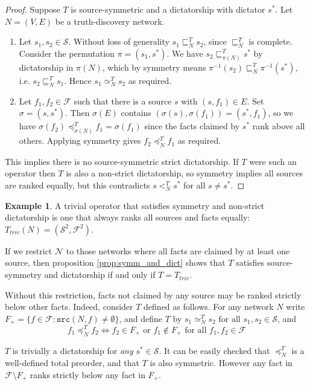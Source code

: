 \documentclass{article}
\theoremstyle{definition} \newtheorem{definition}{Definition}
\theoremstyle{definition} \newtheorem{example}{Example}
\theoremstyle{plain} \newtheorem{axiom}{Axiom}
\theoremstyle{plain} \newtheorem*{remark}{Remark}
\theoremstyle{remark} \newtheorem*{notation}{Notation}
\theoremstyle{plain} \newtheorem{lemma}{Lemma}
\theoremstyle{plain} \newtheorem{proposition}{Proposition}
\renewcommand{\S}{\mathcal{S}}  %
\newcommand{\F}{\mathcal{F}}
\newcommand{\N}{\mathcal{N}}
\newcommand{\sle}{\sqsubseteq}
\newcommand{\slt}{<}
\newcommand{\seq}{\simeq}
\newcommand{\fle}{\preceq}
\newcommand{\src}{\texttt{src}}
\begin{document}
\begin{proof}
Suppose $T$ is source-symmetric and a dictatorship with dictator $s^*$. Let
$N=(V,E)$ be a truth-discovery network.
\begin{enumerate}
\item
    Let $s_1, s_2 \in \S$. Without loss of generality $s_1 \sle_N^T s_2$, since
    $\sle_N^T$ is complete. Consider the permutation $\pi=(s_1, s^*)$.  We have
    $s_2 \sle_{\pi(N)}^T s^*$ by dictatorship in $\pi(N)$, which by symmetry
    means $\pi^{-1}(s_2) \sle_N^T \pi^{-1}(s^*)$, i.e. $s_2 \sle_N^T s_1$.
    Hence $s_1 \seq_N^T s_2$ as required.

\item
    Let $f_1, f_2 \in \F$ such that there is a source $s$ with $(s, f_1) \in E$.
    Set $\sigma=(s, s^*)$. Then $\sigma(E)$ contains $(\sigma(s), \sigma(f_1))
    = (s^*, f_1)$, so we have $\sigma(f_2) \fle_{\sigma(N)}^T f_1 =
    \sigma(f_1)$ since the facts claimed by $s^*$ rank above all others.
    Applying symmetry gives $f_2 \fle_N^T f_1$ as required.
\end{enumerate}

This implies there is no source-symmetric strict dictatorship. If $T$ were such
an operator then $T$ is also a non-strict dictatorship, so symmetry implies
all sources are ranked equally, but this contradicts $s \slt_N^T s^*$ for all
$s \ne s^*$.

\end{proof}

\begin{example}
A trivial operator that satisfies symmetry and non-strict dictatorship is one
that always ranks all sources and facts equally: $T_{triv}(N) = (\S^2, \F^2)$.

If we restrict $\N$ to those networks where all facts are claimed by
at least one source, then proposition \ref{prop:symm_and_dict} shows that $T$
satisfies source-symmetry and dictatorship if and only if $T=T_{triv}$.

Without this restriction, facts not claimed by any source may be ranked
strictly below other facts. Indeed, consider $T$ defined as follows. For any
network $N$ write $F_{+} = \{f \in \F : \src(N, f) \ne \emptyset \}$, and
define $T$ by $s_1 \seq_N^{T} s_2 \text{ for all } s_1, s_2 \in \S$, and
$$
    f_1 \fle_N^{T} f_2 \iff f_2 \in F_{+} \text{ or } f_1 \notin F_{+}
    \text{ for all } f_1, f_2 \in \F
$$

$T$ is trivially a dictatorship for \emph{any} $s^* \in \S$. It can be easily
checked that $\fle_N^T$ is a well-defined total preorder, and that $T$ is also
symmetric. However any fact in $\F \setminus F_+$ ranks strictly below any fact
in $F_+$.
\end{example}
\end{document}
